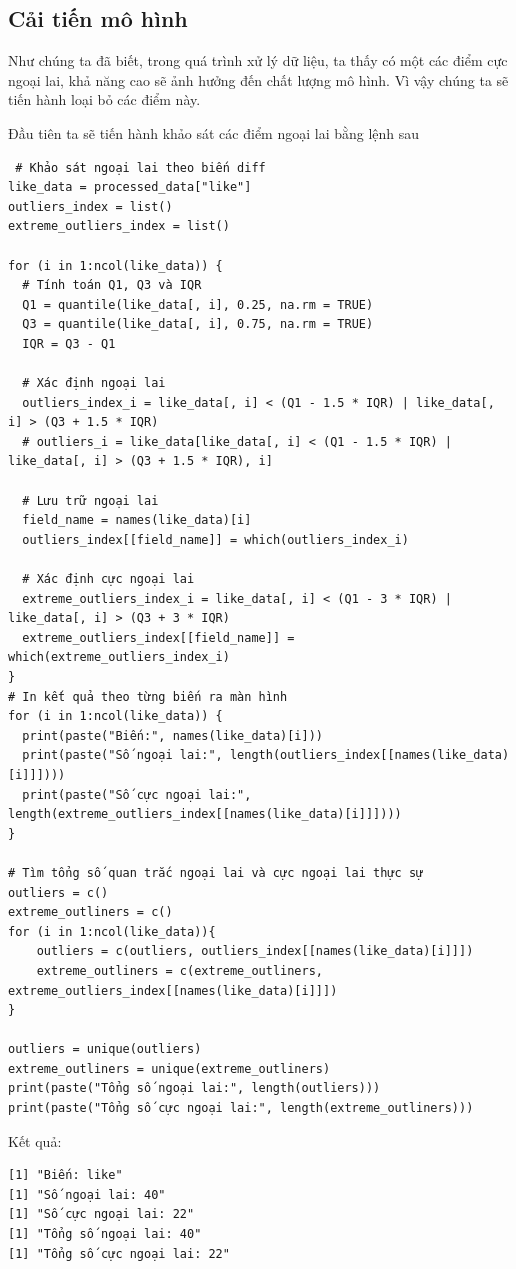 \begin{itemize}
 \subsection{Cải tiến mô hình}
 Như chúng ta đã biết, trong quá trình xử lý dữ liệu, ta thấy có một các điểm cực ngoại lai, khả năng cao sẽ ảnh hưởng đến chất lượng mô hình. Vì vậy chúng ta sẽ tiến hành loại bỏ các điểm này.

 Đầu tiên ta sẽ tiến hành khảo sát các điểm ngoại lai bằng lệnh sau

 \begin{lstlisting}
 # Khảo sát ngoại lai theo biến diff
like_data = processed_data["like"]
outliers_index = list()
extreme_outliers_index = list()

for (i in 1:ncol(like_data)) {
  # Tính toán Q1, Q3 và IQR
  Q1 = quantile(like_data[, i], 0.25, na.rm = TRUE)
  Q3 = quantile(like_data[, i], 0.75, na.rm = TRUE)
  IQR = Q3 - Q1

  # Xác định ngoại lai
  outliers_index_i = like_data[, i] < (Q1 - 1.5 * IQR) | like_data[, i] > (Q3 + 1.5 * IQR)
  # outliers_i = like_data[like_data[, i] < (Q1 - 1.5 * IQR) | like_data[, i] > (Q3 + 1.5 * IQR), i]

  # Lưu trữ ngoại lai
  field_name = names(like_data)[i]
  outliers_index[[field_name]] = which(outliers_index_i)

  # Xác định cực ngoại lai
  extreme_outliers_index_i = like_data[, i] < (Q1 - 3 * IQR) | like_data[, i] > (Q3 + 3 * IQR)
  extreme_outliers_index[[field_name]] = which(extreme_outliers_index_i)
}
# In kết quả theo từng biến ra màn hình
for (i in 1:ncol(like_data)) {
  print(paste("Biến:", names(like_data)[i]))
  print(paste("Số ngoại lai:", length(outliers_index[[names(like_data)[i]]])))
  print(paste("Số cực ngoại lai:", length(extreme_outliers_index[[names(like_data)[i]]])))
}

# Tìm tổng số quan trắc ngoại lai và cực ngoại lai thực sự
outliers = c()
extreme_outliners = c()
for (i in 1:ncol(like_data)){
    outliers = c(outliers, outliers_index[[names(like_data)[i]]])
    extreme_outliners = c(extreme_outliners, extreme_outliers_index[[names(like_data)[i]]])
}

outliers = unique(outliers)
extreme_outliners = unique(extreme_outliners)
print(paste("Tổng số ngoại lai:", length(outliers)))
print(paste("Tổng số cực ngoại lai:", length(extreme_outliners)))
 \end{lstlisting}

\newpage
 Kết quả:
 \begin{lstlisting}
[1] "Biến: like"
[1] "Số ngoại lai: 40"
[1] "Số cực ngoại lai: 22"
[1] "Tổng số ngoại lai: 40"
[1] "Tổng số cực ngoại lai: 22"
 \end{lstlisting}


\end{itemize}

